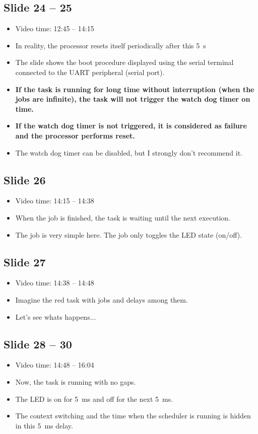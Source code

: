 \documentclass[12pt, a4paper]{article}
\begin{document}
	\subsection{Slide 24 -- 25}
	\begin{itemize}
		\item Video time: 12:45 -- 14:15
		\item In reality, the processor resets itself periodically after this \SI{5}{s}
		\item The slide shows the boot procedure displayed using the serial terminal connected to the UART peripheral (serial port).
		\item \textbf{If the task is running for long time without interruption (when the jobs are infinite), the task will not trigger the watch dog timer on time.}
		\item \textbf{If the watch dog timer is not triggered, it is considered as failure and the processor performs reset.}
		\item The watch dog timer can be disabled, but I strongly don't recommend it.
	\end{itemize}

	\subsection{Slide 26}
	\begin{itemize}
		\item Video time: 14:15 -- 14:38
		\item When the job is finished, the task is waiting until the next execution.
		\item The job is very simple here. The job only toggles the LED state (on/off).
	\end{itemize}

	\subsection{Slide 27}
	\begin{itemize}
		\item Video time: 14:38 -- 14:48
		\item Imagine the red task with jobs and delays among them.
		\item Let's see whats happens...
	\end{itemize}

	\subsection{Slide 28 -- 30}
	\begin{itemize}
		\item Video time: 14:48 -- 16:04
		\item Now, the task is running with no gaps.
		\item The LED is on for \SI{5}{ms} and off for the next \SI{5}{ms}.
		\item The context switching and the time when the scheduler is running is hidden in this \SI{5}{ms} delay.
	\end{itemize}
\end{document}
